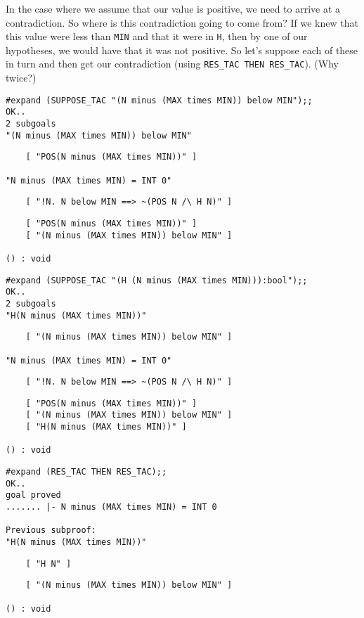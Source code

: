 In the case where we assume that our value is positive, we need to
arrive at a contradiction.  So where is this contradiction going to
come from?  If we knew that this value were less than
{\small\verb+MIN+} and that it were in {\small\tt H}, then by one of
our hypotheses, we would have that it was not positive.  So let's
suppose each of these in turn and then get our contradiction (using
{\small\verb+RES_TAC THEN RES_TAC+}).  (Why twice?)
\begin{session}
\begin{verbatim}
#expand (SUPPOSE_TAC "(N minus (MAX times MIN)) below MIN");;
OK..
2 subgoals
"(N minus (MAX times MIN)) below MIN"
\end{verbatim}
\mvdots
\begin{verbatim}
    [ "POS(N minus (MAX times MIN))" ]

"N minus (MAX times MIN) = INT 0"
\end{verbatim}
\mvdots
\begin{verbatim}
    [ "!N. N below MIN ==> ~(POS N /\ H N)" ]
\end{verbatim}
\mvdots
\begin{verbatim}
    [ "POS(N minus (MAX times MIN))" ]
    [ "(N minus (MAX times MIN)) below MIN" ]

() : void
\end{verbatim}
\end{session}
\begin{session}
\begin{verbatim}
#expand (SUPPOSE_TAC "(H (N minus (MAX times MIN))):bool");;
OK..
2 subgoals
"H(N minus (MAX times MIN))"
\end{verbatim}
\mvdots
\begin{verbatim}
    [ "(N minus (MAX times MIN)) below MIN" ]

"N minus (MAX times MIN) = INT 0"
\end{verbatim}
\mvdots
\begin{verbatim}
    [ "!N. N below MIN ==> ~(POS N /\ H N)" ]
\end{verbatim}
\mvdots
\begin{verbatim}
    [ "POS(N minus (MAX times MIN))" ]
    [ "(N minus (MAX times MIN)) below MIN" ]
    [ "H(N minus (MAX times MIN))" ]

() : void
\end{verbatim}
\end{session}
\begin{session}
\begin{verbatim}
#expand (RES_TAC THEN RES_TAC);;
OK..
goal proved
....... |- N minus (MAX times MIN) = INT 0

Previous subproof:
"H(N minus (MAX times MIN))"
\end{verbatim}
\mvdots
\begin{verbatim}
    [ "H N" ]
\end{verbatim}
\mvdots
\begin{verbatim}
    [ "(N minus (MAX times MIN)) below MIN" ]

() : void
\end{verbatim}
\end{session}


